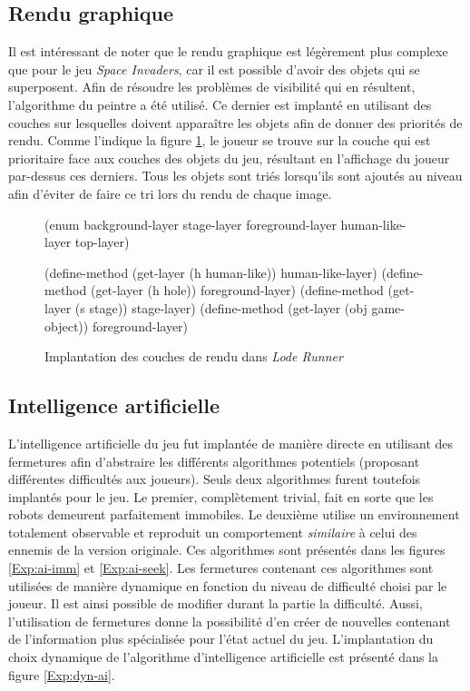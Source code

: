 \documentclass[12pt,twoside,letterpaper,francais]{book}
\newcommand{\scheme}[1]{\selectlanguage{english}{\tt #1}\selectlanguage{french}}
\begin{document}
\subsection{Rendu graphique}
Il est intéressant de noter que le rendu graphique est légèrement plus
complexe que pour le jeu \textit{Space Invaders}, car il est possible
d'avoir des objets qui se superposent. Afin de résoudre les problèmes
de visibilité qui en résultent, l'algorithme du peintre a été
utilisé. Ce dernier est implanté en utilisant des couches sur
lesquelles doivent apparaître les objets afin de donner des priorités
de rendu. Comme l'indique la figure \ref{Exp:layers}, le joueur se
trouve sur la couche \scheme{human-like-layer} qui est prioritaire
face aux couches des objets du jeu, résultant en l'affichage du joueur
par-dessus ces derniers. Tous les objets sont triés lorsqu'ils sont
ajoutés au niveau afin d'éviter de faire ce tri lors du rendu de
chaque image.\\

\begin{figure}[htb!]
  \begin{schemecode}
(enum background-layer stage-layer foreground-layer 
      human-like-layer top-layer)

(define-method (get-layer (h human-like))    human-like-layer)
(define-method (get-layer (h hole))          foreground-layer)
(define-method (get-layer (s stage))         stage-layer)
(define-method (get-layer (obj game-object)) foreground-layer)
  \end{schemecode}
  \caption{Implantation des couches de rendu dans \textit{Lode Runner}}
  \label{Exp:layers}
\end{figure}


\FloatBarrier
\subsection{Intelligence artificielle}
L'intelligence artificielle du jeu fut implantée de manière directe en
utilisant des fermetures afin d'abstraire les différents algorithmes
potentiels (proposant différentes difficultés aux joueurs). Seuls deux
algorithmes furent toutefois implantés pour le jeu. Le premier,
complètement trivial, fait en sorte que les robots demeurent
parfaitement immobiles.  Le deuxième utilise un environnement
totalement observable et reproduit un comportement \emph{similaire} à
celui des ennemis de la version originale. Ces algorithmes sont
présentés dans les figures \ref{Exp:ai-imm} et \ref{Exp:ai-seek}. Les
fermetures contenant ces algorithmes sont utilisées de manière
dynamique en fonction du niveau de difficulté choisi par le joueur. Il
est ainsi possible de modifier durant la partie la difficulté. Aussi,
l'utilisation de fermetures donne la possibilité d'en créer de
nouvelles contenant de l'information plus spécialisée pour l'état
actuel du jeu. L'implantation du choix dynamique de l'algorithme
d'intelligence artificielle est présenté dans la figure
\ref{Exp:dyn-ai}.\\
\end{document}
